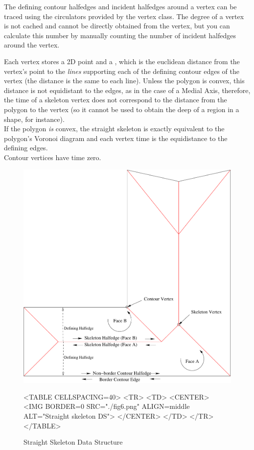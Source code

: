 The defining contour halfedges and incident halfedges around a vertex can be traced using the circulators provided by the vertex class. The degree of a vertex is not cached and cannot be directly obtained from the vertex, but you can calculate this number by manually counting the number of incident halfedges around the vertex.

Each vertex stores a 2D point and a , which is the euclidean distance from the vertex's point to the \textit{lines} supporting each of the defining contour edges of the vertex (the distance is the same to each line). Unless the polygon is convex, this distance is not equidistant to the edges, as in the case of a Medial Axis, therefore, the time of a skeleton vertex does not correspond to the distance from the polygon to the vertex (so it cannot be used to obtain the deep of a region in a shape, for instance).\\
If the polygon \textit{is} convex, the straight skeleton is exactly equivalent to the polygon's Voronoi diagram and each vertex time is the equidistance to the defining edges.\\
Contour vertices have time zero.

\begin{figure}[htbp]
\begin{ccTexOnly}
\begin{center}
\includegraphics{Straight_skeleton_2/fig6} %
\end{center}
\end{ccTexOnly}

\begin{ccHtmlOnly}
<TABLE CELLSPACING=40>
<TR>
<TD>
<CENTER>
<IMG BORDER=0 SRC="./fig6.png" ALIGN=middle ALT="Straight skeleton DS">
</CENTER>
</TD>
</TR>
</TABLE>
\end{ccHtmlOnly}

\caption{Straight Skeleton Data Structure
\label{Simplepoly-offsets}}
\end{figure}

